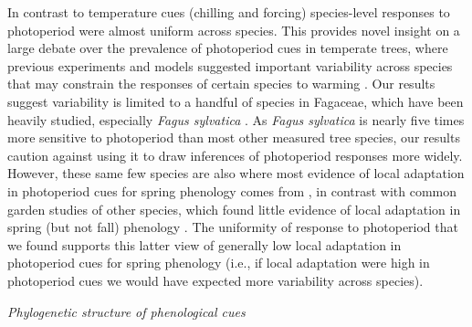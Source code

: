 \documentclass[11pt]{article}
\begin{document}
In contrast to temperature cues (chilling and forcing) species-level responses to photoperiod were almost uniform across species. This provides novel insight on a large debate over the prevalence of photoperiod cues in temperate trees, where previous experiments \citep{Basler:2012,zohner2016} and models \citep[e.g.,][]{Hunter:1992jw,schaber20203} suggested important variability across species that may constrain the responses of certain species to warming \citep{way2015}. Our results suggest variability is limited to a handful of species in Fagaceae, which have been heavily studied, especially \emph{Fagus sylvatica} \citep[e.g.,][]{Basler:2012,zohner2016,kramer2017}. As \emph{Fagus sylvatica} is nearly five times more sensitive to photoperiod than most other measured tree species, our results caution against using it to draw inferences of photoperiod responses more widely. However, these same few species are also where most evidence of local adaptation in photoperiod cues for spring phenology comes from \citep[e.g.,][]{kramer2017}, in contrast with common garden studies of other species, which found little evidence of local adaptation in spring (but not fall) phenology \citep{aitken2016}. The uniformity of response to photoperiod that we found supports this latter view of generally low local adaptation in photoperiod cues for spring phenology (i.e., if local adaptation were high in photoperiod cues we would have expected more variability across species). 

\emph{Phylogenetic structure of phenological cues}
\end{document}
